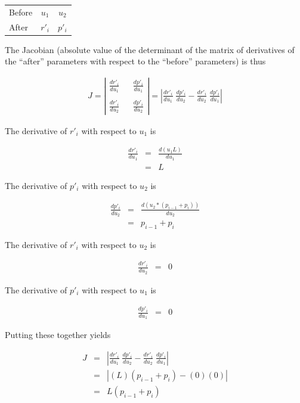 \documentclass[12pt]{article}
\begin{document}
\begin{center}
\begin{tabular}{lcc}
Before & $u_1$  & $u_2$ \\
After  & $r'_i$ & $p'_i$
\end{tabular}
\end{center}

The Jacobian (absolute value of the determinant of the matrix of derivatives of the ``after'' parameters with respect to the ``before'' parameters) is thus

\begin{eqnarray*}
J = \left| 
\begin{array}{ccc}
\frac{d r'_i}{d u_1} & & \frac{d p'_i}{d u_1} \\
& & \\
\frac{d r'_i}{d u_2} & & \frac{d p'_i}{d u_2}
\end{array}
\right|
= \left| \frac{d r'_i}{d u_1} \; \frac{d p'_i}{d u_2} - \frac{d r'_i}{d u_2} \; \frac{d p'_i}{d u_1} \right|
\end{eqnarray*}

The derivative of $r'_i$ with respect to $u_1$ is

\begin{eqnarray*}
\frac{d r'_i}{d u_1} & = & \frac{d (u_1 L)}{d u_1} \\
& = & L
\end{eqnarray*}

The derivative of $p'_i$ with respect to $u_2$ is

\begin{eqnarray*}
\frac{d p'_i}{d u_2} & = & \frac{d (u_2*(p_{i-1} + p_i))}{d u_2} \\
& = & p_{i-1} + p_i
\end{eqnarray*}

The derivative of $r'_i$ with respect to $u_2$ is 

\begin{eqnarray*}
\frac{d r'_i}{d u_2} & = & 0
\end{eqnarray*}

The derivative of $p'_i$ with respect to $u_1$ is

\begin{eqnarray*}
\frac{d p'_i}{d u_1} & = & 0
\end{eqnarray*}

Putting these together yields

\begin{eqnarray*}
J & = & \left| \frac{d r'_i}{d u_1} \; \frac{d p'_i}{d u_2} - \frac{d r'_i}{d u_2} \; \frac{d p'_i}{d u_1} \right| \\
& = & \left| (L)(p_{i-1} + p_i) - (0)(0) \right| \\
& = & L(p_{i-1} + p_i)
\end{eqnarray*}
\end{document}
